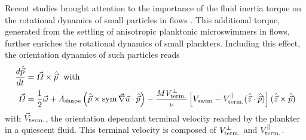 Recent studies brought attention to the importance of the fluid inertia torque on the rotational dynamics of small particles in flows \citep{gustavsson2019effect, sheikh2020importance, anand2020orientation, qiu2022gyrotactic}.
This additional torque, generated from the settling of anisotropic planktonic microswimmers in flows, further enriches the rotational dynamics of small plankters.
Including this effect, the orientation dynamics of such particles reads
\begin{subequations}
	\begin{align}
		\frac{d \hat{\vec{p}}}{dt} &= \vec{\varOmega} \times \hat{\vec{p}} ~~ \text{with}\\
		\vec{\varOmega} &= \frac{1}{2} \vec{\omega} + \varLambda_{\mathrm{shape}} \left( \hat{\vec{p}} \times \operatorname{sym} \vec{\nabla} \vec{u} \cdot \hat{\vec{p}} \right) - \frac{M V_{\mathrm{term.}}^\perp}{\nu} \left[ V_{\mathrm{swim}} - V_{\mathrm{term.}}^\parallel (\hat{\vec{z}} \cdot \hat{\vec{p}}) \right] (\hat{\vec{z}} \times \hat{\vec{p}})
	\end{align}
\end{subequations}
with $\vec{V}_{\mathrm{term.}}$, the orientation dependant terminal velocity reached by the plankter in a quiescent fluid. 
This terminal velocity is composed of $V_{\mathrm{term.}}^\perp$ and $V_{\mathrm{term.}}^\parallel$.
